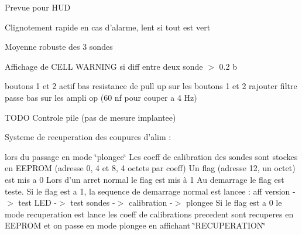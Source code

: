 \begin{DoxyItemize}
\item Prevue pour HUD 
\item Clignotement rapide en cas d'alarme, lent si tout est vert 
\item Moyenne robuste des 3 sondes 
\item Affichage de CELL WARNING si diff entre deux sonde $>$ 0.2 b 
\end{DoxyItemize}boutons 1 et 2 actif bas resistance de pull up sur les boutons 1 et 2 rajouter filtre passe bas sur les ampli op (60 nf pour couper a 4 Hz)

TODO Controle pile (pas de mesure implantee)

Systeme de recuperation des coupures d'alim :

lors du passage en mode \char`\"{}plongee\char`\"{} Les coeff de calibration des sondes sont stockes en EEPROM (adresse 0, 4 et 8, 4 octets par coeff) Un flag (adresse 12, un octet) est mis a 0 Lors d'un arret normal le flag est mis à 1 Au demarrage le flag est teste. Si le flag est a 1, la sequence de demarrage normal est lancee : aff version -\/$>$ test LED -\/$>$ test sondes -\/$>$ calibration -\/$>$ plongee Si le flag est a 0 le mode recuperation est lance les coeff de calibrations precedent sont recuperes en EEPROM et on passe en mode plongee en affichant \char`\"{}RECUPERATION\char`\"{} 
\begin{DoxyPre}\end{DoxyPre}



